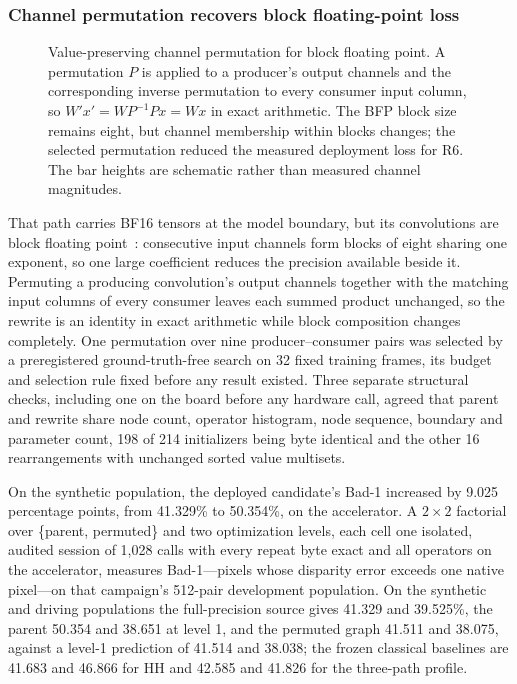 \documentclass[sigconf,review,anonymous]{acmart}
\begin{document}
\subsubsection{Channel permutation recovers block floating-point loss}
\begin{figure}[t]
\centering
\resizebox{\columnwidth}{!}{}
\caption{Value-preserving channel permutation for block floating point. A permutation $P$ is applied to a producer's output channels and the corresponding inverse permutation to every consumer input column, so $W' x' = W P^{-1} P x = W x$ in exact arithmetic. The BFP block size remains eight, but channel membership within blocks changes; the selected permutation reduced the measured deployment loss for R6. The bar heights are schematic rather than measured channel magnitudes.}
\label{fig:bfpperm}
\end{figure}
That path carries BF16 tensors at the model boundary, but its convolutions are block floating point~\cite{rbq_amdquarkbfp16}: consecutive input channels form blocks of eight sharing one exponent, so one large coefficient reduces the precision available beside it. Permuting a producing convolution's output channels together with the matching input columns of every consumer leaves each summed product unchanged, so the rewrite is an identity in exact arithmetic while block composition changes completely. One permutation over nine producer--consumer pairs was selected by a preregistered ground-truth-free search on 32 fixed training frames, its budget and selection rule fixed before any result existed. Three separate structural checks, including one on the board before any hardware call, agreed that parent and rewrite share node count, operator histogram, node sequence, boundary and parameter count, 198 of 214 initializers being byte identical and the other 16 rearrangements with unchanged sorted value multisets.

On the synthetic population, the deployed candidate's Bad-1 increased by 9.025 percentage points, from 41.329\% to 50.354\%, on the accelerator. A $2\times2$ factorial over \{parent, permuted\} and two optimization levels, each cell one isolated, audited session of 1,028 calls with every repeat byte exact and all operators on the accelerator, measures Bad-1---pixels whose disparity error exceeds one native pixel---on that campaign's 512-pair development population. On the synthetic and driving populations the full-precision source gives 41.329 and 39.525\%, the parent 50.354 and 38.651 at level 1, and the permuted graph 41.511 and 38.075, against a level-1 prediction of 41.514 and 38.038; the frozen classical baselines are 41.683 and 46.866 for HH and 42.585 and 41.826 for the three-path profile.
\end{document}
